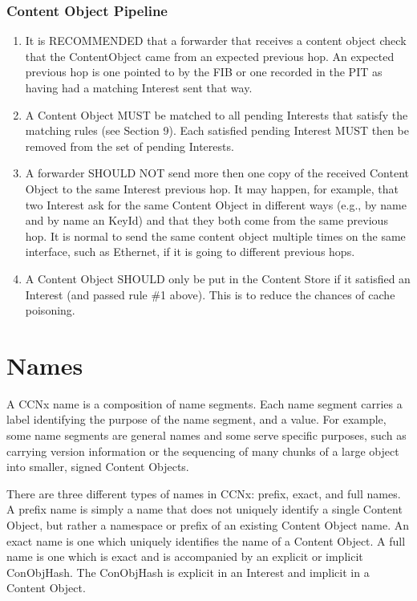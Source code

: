 \documentclass[12pt]{report}
\begin{document}
\subsubsection{Content Object Pipeline}
\begin{enumerate}
\item  It is RECOMMENDED that a forwarder that receives a content object
    check that the ContentObject came from an expected previous hop.
    An expected previous hop is one pointed to by the FIB or one
    recorded in the PIT as having had a matching Interest sent that
    way.

\item  A Content Object MUST be matched to all pending Interests that
    satisfy the matching rules (see Section 9).  Each satisfied
    pending Interest MUST then be removed from the set of pending
    Interests.

\item  A forwarder SHOULD NOT send more then one copy of the received
    Content Object to the same Interest previous hop.  It may happen,
    for example, that two Interest ask for the same Content Object in
    different ways (e.g., by name and by name an KeyId) and that they
    both come from the same previous hop.  It is normal to send the
    same content object multiple times on the same interface, such as
    Ethernet, if it is going to different previous hops.

\item  A Content Object SHOULD only be put in the Content Store if it
    satisfied an Interest (and passed rule \#1 above).  This is to
    reduce the chances of cache poisoning.
\end{enumerate}

\section{Names}
A CCNx name is a composition of name segments.  Each name segment
carries a label identifying the purpose of the name segment, and a
value.  For example, some name segments are general names and some
serve specific purposes, such as carrying version information or the
sequencing of many chunks of a large object into smaller, signed
Content Objects.

There are three different types of names in CCNx: prefix, exact, and
full names.  A prefix name is simply a name that does not uniquely
identify a single Content Object, but rather a namespace or prefix of
an existing Content Object name.  An exact name is one which uniquely
identifies the name of a Content Object.  A full name is one which is
exact and is accompanied by an explicit or implicit ConObjHash.  The
ConObjHash is explicit in an Interest and implicit in a Content
Object.
\end{document}

